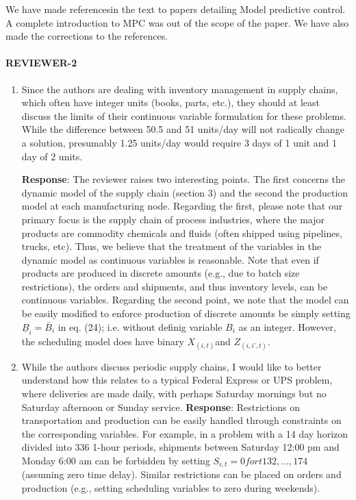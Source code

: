 \documentclass{article}
\newcommand{\response}[1]{\textbf{Response}: #1}
\begin{document}
\begin{enumerate}
{We have made referencesin the text to papers detailing Model
predictive control. A complete introduction to MPC was out of the
scope of the paper. We have also made the corrections to the references.}
\end{enumerate}
\paragraph{REVIEWER-2}
\begin{enumerate}
\item Since the authors are dealing with inventory management in supply chains, which often have 
integer units (books, parts, etc.), they should at least discuss the limits of their continuous 
variable formulation for these problems. While the difference between 50.5 and 51 units/day will 
not radically change a solution, presumably 1.25 units/day would require 3 days of 1 unit and 1 
day of 2 units. 

\response{The reviewer raises two interesting points. The first concerns the dynamic model of 
the supply chain (section 3) and the second the production model at each manufacturing node.
Regarding the first, please note that our primary focus is the supply chain of process industries, 
where the major products are commodity chemicals and fluids (often shipped using pipelines, 
trucks, etc). Thus, we believe that the treatment of the variables in the dynamic model as 
continuous variables is reasonable. Note that even if products are produced in discrete 
amounts (e.g., due to batch size restrictions), the orders and shipments, and thus inventory 
levels, can be continuous variables. Regarding the second point, we note that the model can be 
easily modified to enforce production of discrete amounts be simply
setting $\underline{B}_i = \bar{B}_i$ in eq. (24); 
i.e. without definig variable $B_i$ as an integer. However, the scheduling model does have binary 
 $X_{(i,t)}$and $Z_{(i,i’,t)}$.}

\item While the authors discuss periodic supply chains, I would like to better understand how this 
relates to a typical Federal Express or UPS problem, where deliveries are made daily, with 
perhaps Saturday mornings but no Saturday afternoon or Sunday service.
\response{Restrictions on transportation and production can be easily handled through
constraints on the corresponding variables. For example, in a problem with a 14 day horizon 
divided into 336 1-hour periods, shipments between Saturday 12:00 pm and Monday 6:00 am 
can be forbidden by setting $S_{i,t} = 0 for t {132, …, 174}$ (assuming zero time delay). Similar 
restrictions can be placed on orders and production (e.g., setting scheduling variables to zero 
during weekends).}
\end{enumerate}
\end{document}

